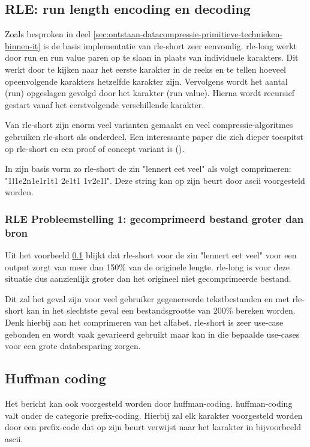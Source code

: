 \subsection{RLE: run length encoding en decoding}
\label{sec:primitieve-technieken-voorbeeld-rle}
Zoals besproken in deel \ref{sec:ontstaan-datacompressie-primitieve-technieken-binnen-it} is de basis implementatie van \gls{rle-short} zeer eenvoudig. \Gls{rle-long} werkt door run en run value paren op te slaan in plaats van individuele karakters. Dit werkt door te kijken naar het eerste karakter in de reeks en te tellen hoeveel opeenvolgende karakters hetzelfde karakter zijn. Vervolgens wordt het aantal (run) opgeslagen gevolgd door het karakter (run value). Hierna wordt recursief gestart vanaf het eerstvolgende verschillende karakter.

Van \gls{rle-short} zijn enorm veel varianten gemaakt en veel \glspl{compressie-algoritme} gebruiken \gls{rle-short} als onderdeel. Een interessante paper die zich dieper toespitst op \gls{rle-short} en een proof of concept variant is  (\cite{rleimproved}). 

In zijn basis vorm zo \gls{rle-short} de zin "lennert eet veel" als volgt comprimeren: 
"1l1e2n1e1r1t1 2e1t1 1v2e1l". Deze string kan op zijn beurt door \gls{ascii} voorgesteld worden.

\subsubsection{RLE Probleemstelling 1: gecomprimeerd bestand groter dan bron}
\label{sec:primitieve-technieken-voorbeeld-rle-probleem-1}
Uit het voorbeeld \ref{sec:primitieve-technieken-voorbeeld-rle} blijkt dat \gls{rle-short} voor de zin "lennert eet veel" voor een output zorgt van meer dan 150\% van de originele lengte. \Gls{rle-long} is voor deze situatie dus aanzienlijk groter dan het origineel niet gecomprimeerde bestand. 

Dit zal het geval zijn voor veel gebruiker gegenereerde tekstbestanden en met \gls{rle-short} kan in het slechtste geval een bestandsgrootte van 200\% bereken worden. Denk hierbij aan het comprimeren van het alfabet. \Gls{rle-short} is zeer \gls{use-case} gebonden en wordt vaak gevarieerd gebruikt maar kan in die bepaalde \glspl{use-case} voor een grote databesparing zorgen.

\subsection{Huffman coding}
\label{sec:primitieve-technieken-voorbeeld-huffman-encoding}
Het bericht kan ook voorgesteld worden door \gls{huffman-coding}. \gls{huffman-coding} valt onder de categorie \gls{prefix-coding}. Hierbij zal elk karakter voorgesteld worden door een \gls{prefix-code} dat op zijn beurt verwijst naar het karakter in bijvoorbeeld \gls{ascii}. 

